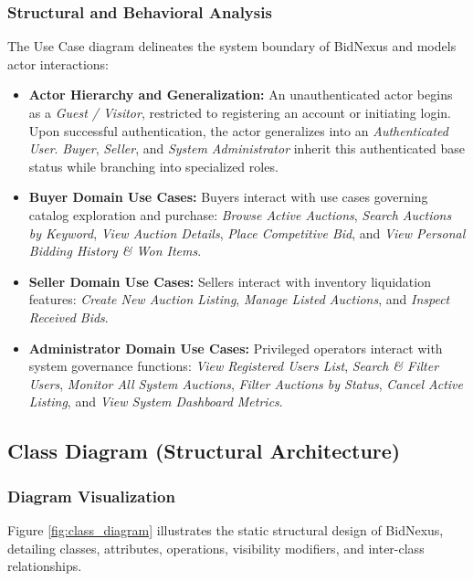 \subsubsection{Structural and Behavioral Analysis}
The Use Case diagram delineates the system boundary of BidNexus and models actor interactions:
\begin{itemize}
    \item \textbf{Actor Hierarchy and Generalization:} An unauthenticated actor begins as a \textit{Guest / Visitor}, restricted to registering an account or initiating login. Upon successful authentication, the actor generalizes into an \textit{Authenticated User}. \textit{Buyer}, \textit{Seller}, and \textit{System Administrator} inherit this authenticated base status while branching into specialized roles.
    \item \textbf{Buyer Domain Use Cases:} Buyers interact with use cases governing catalog exploration and purchase: \textit{Browse Active Auctions}, \textit{Search Auctions by Keyword}, \textit{View Auction Details}, \textit{Place Competitive Bid}, and \textit{View Personal Bidding History \& Won Items}.
    \item \textbf{Seller Domain Use Cases:} Sellers interact with inventory liquidation features: \textit{Create New Auction Listing}, \textit{Manage Listed Auctions}, and \textit{Inspect Received Bids}.
    \item \textbf{Administrator Domain Use Cases:} Privileged operators interact with system governance functions: \textit{View Registered Users List}, \textit{Search \& Filter Users}, \textit{Monitor All System Auctions}, \textit{Filter Auctions by Status}, \textit{Cancel Active Listing}, and \textit{View System Dashboard Metrics}.
\end{itemize}

\subsection{Class Diagram (Structural Architecture)}
\label{subsec:uml_class}

\subsubsection{Diagram Visualization}
Figure \ref{fig:class_diagram} illustrates the static structural design of BidNexus, detailing classes, attributes, operations, visibility modifiers, and inter-class relationships.

